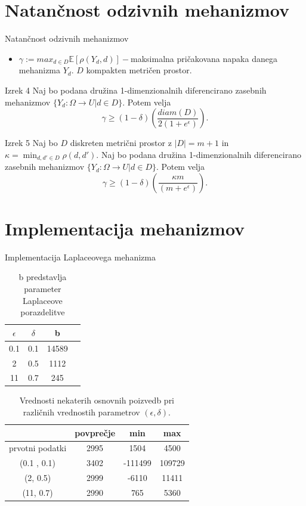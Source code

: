 \documentclass{beamer}
\begin{document}
\section{Natančnost odzivnih mehanizmov}
\begin{frame}{Natančnost odzivnih mehanizmov}
\begin{itemize}
\item $\gamma := max_{d\in D}\mathbb{E}[\rho(Y_d,d)]-$maksimalna pričakovana napaka danega mehanizma $Y_d$. $D$ kompakten metričen prostor.
\end{itemize}
\begin{block}{Izrek 4}
 Naj bo podana družina 1-dimenzionalnih diferencirano zasebnih mehanizmov $\{ Y_d: \Omega \rightarrow U | d \in D\}$. Potem velja $$\gamma  \geq (1-\delta)(\frac{diam(D)}{2(1+e^\epsilon)}).$$
\end{block}
\begin{block}{Izrek 5}
Naj bo $D$ diskreten metrični prostor z $|D| = m + 1$ in $\kappa = \min_{d, d' \in D} \rho(d,d')$. Naj bo podana družina 1-dimenzionalnih diferencirano zasebnih mehanizmov $\{ Y_d: \Omega \rightarrow U | d \in D\}$. Potem velja $$\gamma  \geq (1-\delta)(\frac{\kappa m}{(m+e^\epsilon)}).$$
\end{block}
\end{frame}

\section{Implementacija mehanizmov}
\begin{frame}{Implementacija Laplaceovega mehanizma}
\begin{table}
\begin{center}
 \begin{tabular}{| c | c | c | c |} 
 \hline
 \textbf{$\epsilon$} & \textbf{$\delta$} & b   \\ [0.5ex] 
 \hline
 0.1 & 0.1 & 14589  \\ 
 \hline
 2 & 0.5 & 1112\\
 \hline
 11 & 0.7 & 245 \\
 \hline
\end{tabular}
\caption{b predstavlja parameter Laplaceove porazdelitve }
\end{center}
\end{table}
\begin{table}
\begin{center}
 \begin{tabular}{| c | c | c | c |} 
 \hline
 & povprečje & min & max  \\ [0.5ex] 
 \hline
 prvotni podatki & 2995 & 1504 & 4500  \\ 
 \hline
 (0.1 , 0.1) & 3402 & -111499 & 109729\\
 \hline
 (2, 0.5) & 2999 & -6110 & 11411 \\
 \hline
 (11, 0.7) & 2990 & 765 & 5360 \\
 \hline
\end{tabular}
\caption{Vrednosti nekaterih osnovnih poizvedb pri različnih vrednostih parametrov $(\epsilon, \delta)$. }
\end{center}
\end{table}
\end{frame}
\end{document}
